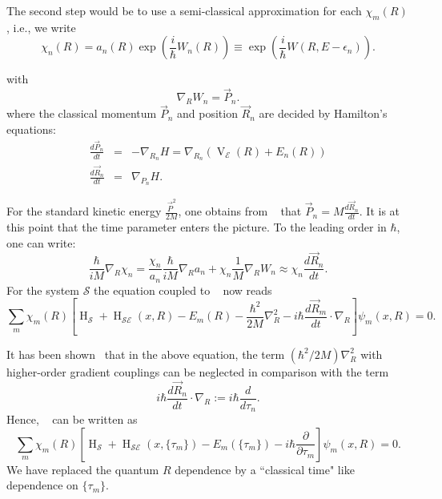 The second step would be to use a semi-classical approximation for each \(\chi_m(R)\), i.e., we write
\begin{equation}
\label{eqn:chap2_WKB_clc}
    \chi_{n}(R) = a_n(R) \exp\left(\frac{i}{\hbar} W_n(R)\right) \equiv \exp\left(\frac{i}{\hbar} W(R, E - \epsilon_n)\right) .
\end{equation}

with
\begin{equation}
    \label{eqn:chap2_clc_action}
    \nabla _R W_n = \vec{P}_n.
\end{equation}
where the classical momentum 
\(\vec{P}_n\) and position \(\vec{R}_n\) are decided by Hamilton's equations:
\begin{eqnarray}
    \label{eqn:chap2_hamilton_eqns1}
    \frac{d\vec{P}_n}{dt} &=& -\nabla_{{R}_n} H = \nabla_{R_n}\left( \operatorname{V}_{\mathcal{E}}(R) + E_n(R)\right)\\
    \label{eqn:chap2_hamilton_eqns2}
    \frac{d\vec{R}_n}{dt} &=& \nabla_{{P}_n} H.
\end{eqnarray}

For the standard kinetic energy \(\frac{\vec{P}^2}{2M}\), one obtains from 
~ that \(\vec{P}_n = M\frac{d\vec{R}_n}{dt}\). It is at this point
that the time parameter enters the picture. To the leading order in \(\hbar\), one can write:
\begin{equation}
    \frac{\hbar}{iM} \nabla_R \chi_n = \frac{\chi_n}{a_n} \frac{\hbar}{iM} \nabla _R a_n + 
    \chi_n \frac{1}{M} \nabla_R W_n \approx \chi_n \frac{d\vec{R}_n}{dt}.
\end{equation}
For the system \(\mathcal{S}\) the equation coupled to ~ now reads
\begin{equation}
    \label{eqn:chap2_system_evol_mod2}
    \sum_{m} \chi_m(R) \left[
    \operatorname{H}_{\mathcal{S}} + \operatorname{H}_{\mathcal{SE}}(x, R)  - E_m(R)  - \frac{\hbar^2}{2M}\nabla^2 _R -
    i\hbar \frac{d \vec{R}_m}{dt} \cdot \nabla_R \right] \psi_m (x, R)= 0.
\end{equation}

It has been shown~\cite{briggs2001derivation} that in the above equation,
the term \((\hbar^2/2M)\nabla^2 _R\) with higher-order gradient couplings can be neglected in comparison
with the term
\begin{equation*}
i \hbar  \frac{d \vec{R}_n}{dt} \cdot \nabla_{R} := i \hbar \dfrac{d}{d\tau_n}.
\end{equation*}
Hence, ~ can be written as
\begin{equation}
    \label{eqn:chap2_system_evol_mod3}
    \sum_{m} \chi_m(R) \left[
    \operatorname{H}_{\mathcal{S}} + \operatorname{H}_{\mathcal{SE}}(x,
   \{ \tau_m\})  - E_m(\{\tau_m\})  - i \hbar \dfrac{\partial }{\partial \tau_m} \right] 
    \psi_m (x, R)= 0.
\end{equation}
We have replaced the quantum \(R\) dependence by a ``classical time" like dependence on \(\{\tau_m\}\).

